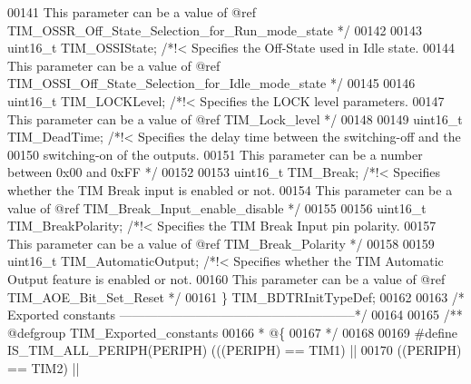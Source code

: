 \begin{DoxyCode}
00141 \textcolor{comment}{                                      This parameter can be a value of @ref
       TIM\_OSSR\_Off\_State\_Selection\_for\_Run\_mode\_state */}
00142 
00143   uint16\_t TIM_OSSIState;        \textcolor{comment}{/*!< Specifies the Off-State used in Idle state.}
00144 \textcolor{comment}{                                      This parameter can be a value of @ref
       TIM\_OSSI\_Off\_State\_Selection\_for\_Idle\_mode\_state */}
00145 
00146   uint16\_t TIM_LOCKLevel;        \textcolor{comment}{/*!< Specifies the LOCK level parameters.}
00147 \textcolor{comment}{                                      This parameter can be a value of @ref TIM\_Lock\_level */}
00148 
00149   uint16\_t TIM_DeadTime;         \textcolor{comment}{/*!< Specifies the delay time between the switching-off and the}
00150 \textcolor{comment}{                                      switching-on of the outputs.}
00151 \textcolor{comment}{                                      This parameter can be a number between 0x00 and 0xFF  */}
00152 
00153   uint16\_t TIM_Break;            \textcolor{comment}{/*!< Specifies whether the TIM Break input is enabled or not. }
00154 \textcolor{comment}{                                      This parameter can be a value of @ref
       TIM\_Break\_Input\_enable\_disable */}
00155 
00156   uint16\_t TIM_BreakPolarity;    \textcolor{comment}{/*!< Specifies the TIM Break Input pin polarity.}
00157 \textcolor{comment}{                                      This parameter can be a value of @ref TIM\_Break\_Polarity */}
00158 
00159   uint16\_t TIM_AutomaticOutput;  \textcolor{comment}{/*!< Specifies whether the TIM Automatic Output feature is enabled or
       not. }
00160 \textcolor{comment}{                                      This parameter can be a value of @ref TIM\_AOE\_Bit\_Set\_Reset */}
00161 \} TIM\_BDTRInitTypeDef;
00162 
00163 \textcolor{comment}{/* Exported constants --------------------------------------------------------*/}
00164 
00165 \textcolor{comment}{/** @defgroup TIM\_Exported\_constants }
00166 \textcolor{comment}{  * @\{}
00167 \textcolor{comment}{  */}
00168 
00169 \textcolor{preprocessor}{#}\textcolor{preprocessor}{define} \textcolor{preprocessor}{IS\_TIM\_ALL\_PERIPH}\textcolor{preprocessor}{(}\textcolor{preprocessor}{PERIPH}\textcolor{preprocessor}{)} \textcolor{preprocessor}{(}\textcolor{preprocessor}{(}\textcolor{preprocessor}{(}\textcolor{preprocessor}{PERIPH}\textcolor{preprocessor}{)} \textcolor{preprocessor}{==} TIM1\textcolor{preprocessor}{)} \textcolor{preprocessor}{||}
00170                                    \textcolor{preprocessor}{(}\textcolor{preprocessor}{(}\textcolor{preprocessor}{PERIPH}\textcolor{preprocessor}{)} \textcolor{preprocessor}{==} TIM2\textcolor{preprocessor}{)} \textcolor{preprocessor}{||}

\end{DoxyCode}
